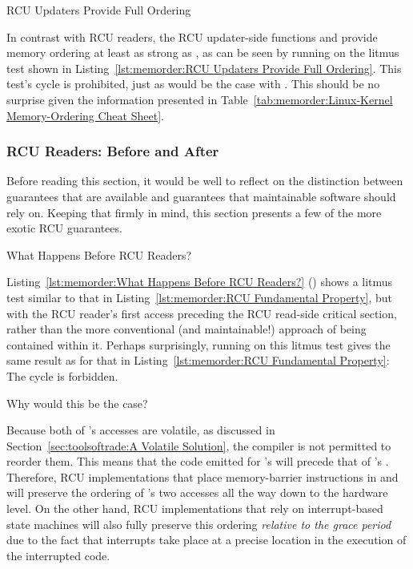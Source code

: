 \begin{listing}[tb]

\caption{RCU Updaters Provide Full Ordering}
\label{lst:memorder:RCU Updaters Provide Full Ordering}
\end{listing}

In contrast with RCU readers, the RCU updater-side functions
 and 
provide memory ordering at least as strong as ,
as can be seen by running  on the litmus test shown in
Listing~\ref{lst:memorder:RCU Updaters Provide Full Ordering}.
This test's cycle is prohibited, just as would be the case with
.
This should be no surprise given the information presented in
Table~\ref{tab:memorder:Linux-Kernel Memory-Ordering Cheat Sheet}.

\subsubsection{RCU Readers: Before and After}
\label{sec:memorder:RCU Readers: Before and After}

Before reading this section, it would be well to reflect on the distinction
between guarantees that are available and guarantees that maintainable
software should rely on.
Keeping that firmly in mind, this section presents a few of the
more exotic RCU guarantees.

\begin{listing}[tb]

\caption{What Happens Before RCU Readers?}
\label{lst:memorder:What Happens Before RCU Readers?}
\end{listing}

Listing~\ref{lst:memorder:What Happens Before RCU Readers?}
()
shows a litmus test similar to that in
Listing~\ref{lst:memorder:RCU Fundamental Property},
but with the RCU reader's first access preceding the RCU read-side critical
section, rather than the more conventional (and maintainable!) approach of
being contained within it.
Perhaps surprisingly, running  on this litmus test gives the
same result as for that in
Listing~\ref{lst:memorder:RCU Fundamental Property}:
The cycle is forbidden.

Why would this be the case?

Because both of 's accesses are volatile,
as discussed in
Section~\ref{sec:toolsoftrade:A Volatile Solution},
the compiler is not permitted to reorder them.
This means that the code emitted for 's  will
precede that of 's .
Therefore, RCU implementations that place memory-barrier instructions in
 and  will preserve the ordering
of 's two accesses all the way down to the hardware level.
On the other hand, RCU implementations that rely on interrupt-based
state machines will also fully preserve this ordering
\emph{relative to the grace period} due to the fact that interrupts take
place at a precise location in the execution of the interrupted code.

